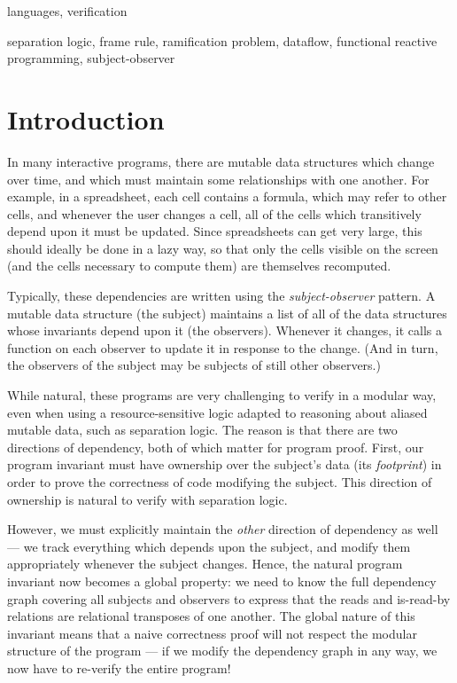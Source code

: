 \documentclass[preprint,natbib]{sigplanconf}
\begin{document}

\terms
languages, verification

\keywords
separation logic, frame rule, ramification problem, dataflow, 
functional reactive programming, subject-observer

\section{Introduction}

In many interactive programs, there are mutable data structures which
change over time, and which must maintain some relationships with one
another. For example, in a spreadsheet, each cell contains a formula,
which may refer to other cells, and whenever the user changes a cell,
all of the cells which transitively depend upon it must be
updated. Since spreadsheets can get very large, this should ideally be
done in a lazy way, so that only the cells visible on the screen (and
the cells necessary to compute them) are themselves recomputed.

Typically, these dependencies are written using the
\emph{subject-observer} pattern. A mutable data structure (the
subject) maintains a list of all of the data structures whose
invariants depend upon it (the observers). Whenever it changes, it
calls a function on each observer to update it in response
to the change. (And in turn, the observers of the subject may be
subjects of still other observers.)

While natural, these programs are very challenging to verify in a
modular way, even when using a resource-sensitive logic adapted to
reasoning about aliased mutable data, such as separation logic. The
reason is that there are two directions of dependency, both of which
matter for program proof. First, our program invariant must have
ownership over the subject's data (its \emph{footprint}) in order to
prove the correctness of code modifying the subject. This direction
of ownership is natural to verify with separation logic. 

However, we must explicitly maintain the \emph{other} direction of
dependency as well --- we track everything which depends upon the
subject, and modify them appropriately whenever the subject changes.
Hence, the natural program invariant now becomes a global property:
we need to know the full dependency graph covering all subjects and
observers to express that the reads and is-read-by relations
are relational transposes of one another. The global nature of this
invariant means that a naive correctness proof will not respect the
modular structure of the program --- if we modify the dependency graph
in any way, we now have to re-verify the entire program!
\end{document}
